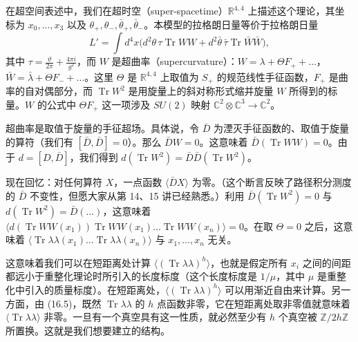 在超空间表述中，我们在超时空（super-spacetime）$\mathbb{R}^{4,4}$ 上描述这个理论，其坐标为 $x_0,\dots,x_3$ 以及 $\theta_+,\theta_-,\bar\theta_+,\bar\theta_-$。本模型的拉格朗日量等价于拉格朗日量
\[
L'=\int d^4x\bigl(d^2\theta\,\tau\operatorname{Tr}WW+d^2\bar\theta\,\bar\tau\operatorname{Tr}\bar W\bar W\bigr),
\]
其中 $\tau=\frac{\vartheta}{2\pi}+\frac{4\pi i}{g^2}$，而 $W$ 是超曲率（supercurvature）：$W=\lambda+\Theta F_++\dots$，$\bar W=\bar\lambda+\Theta F_-+\dots$。这里 $\Theta$ 是 $\mathbb{R}^{4,4}$ 上取值为 $S_+$ 的规范线性手征函数，$F_+$ 是曲率的自对偶部分，而 $\operatorname{Tr}W^2$ 是用旋量上的斜对称形式缩并旋量 $W$ 所得到的标量。$W$ 的公式中 $\Theta F_+$ 这一项涉及 $SU(2)$ 映射 $\mathbb{C}^2\otimes\mathbb{C}^3\to\mathbb{C}^2$。

超曲率是取值于旋量的手征超场。具体说，令 $\bar D$ 为湮灭手征函数的、取值于旋量的算符（我们有 $[\bar D,\bar D]=0$）。那么 $\bar DW=0$。这意味着 $\bar D(\operatorname{Tr}WW)=0$。由于 $d=[D,\bar D]$，我们得到 $d(\operatorname{Tr}W^2)=\bar D\bar D(\operatorname{Tr}W^2)$。

现在回忆：对任何算符 $X$，一点函数 $\langle\bar DX\rangle$ 为零。（这个断言反映了路径积分测度的 $\bar D$ 不变性，但愿大家从第 14、15 讲已经熟悉。）利用 $\bar D(\operatorname{Tr}W^2)=0$ 与 $d(\operatorname{Tr}W^2)=\bar D(\dots)$，这意味着 $\langle d(\operatorname{Tr}WW(x_1))\operatorname{Tr}WW(x_1)\dots\operatorname{Tr}WW(x_n)\rangle=0$。在取 $\Theta=0$ 之后，这意味着 $\langle\operatorname{Tr}\lambda\lambda(x_1)\dots\operatorname{Tr}\lambda\lambda(x_n)\rangle$ 与 $x_1,\dots,x_n$ 无关。



这意味着我们可以在短距离处计算 $\langle(\operatorname{Tr}\lambda\lambda)^h\rangle$，也就是假定所有 $x_i$ 之间的间距都远小于重整化理论时所引入的长度标度（这个长度标度是 $1/\mu$，其中 $\mu$ 是重整化中引入的质量标度）。在短距离处，$\langle(\operatorname{Tr}\lambda\lambda)^h\rangle$ 可以用渐近自由来计算。另一方面，由 (16.5)，既然 $\operatorname{Tr}\lambda\lambda$ 的 $h$ 点函数非零，它在短距离处取非零值就意味着 $\langle\operatorname{Tr}\lambda\lambda\rangle$ 非零。一旦有一个真空具有这一性质，就必然至少有 $h$ 个真空被 $\mathbb{Z}/2h\mathbb{Z}$ 所置换。这就是我们想要建立的结构。


